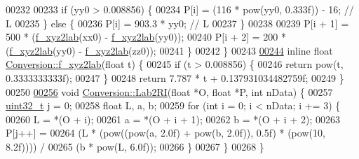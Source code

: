 \begin{DoxyCode}
00232 
00233     \textcolor{keywordflow}{if} (yy0 > 0.008856) \{
00234       P[i] = (116 * pow(yy0, 0.333f)) - 16; \textcolor{comment}{// L}
00235     \} \textcolor{keywordflow}{else} \{
00236       P[i] = 903.3 * yy0; \textcolor{comment}{// L}
00237     \}
00238 
00239     P[i + 1] = 500 * (\hyperlink{class_vision_1_1_conversion_aea73f90915cd0459dcaf70fb3e109a82}{f\_xyz2lab}(xx0) - \hyperlink{class_vision_1_1_conversion_aea73f90915cd0459dcaf70fb3e109a82}{f\_xyz2lab}(yy0));
00240     P[i + 2] = 200 * (\hyperlink{class_vision_1_1_conversion_aea73f90915cd0459dcaf70fb3e109a82}{f\_xyz2lab}(yy0) - \hyperlink{class_vision_1_1_conversion_aea73f90915cd0459dcaf70fb3e109a82}{f\_xyz2lab}(zz0));
00241   \}
00242 \}
00243 
\hypertarget{_conversion_8cpp_source_l00244}{}\hyperlink{class_vision_1_1_conversion_aea73f90915cd0459dcaf70fb3e109a82}{00244} \textcolor{keyword}{inline} \textcolor{keywordtype}{float} \hyperlink{class_vision_1_1_conversion_aea73f90915cd0459dcaf70fb3e109a82}{Conversion::f\_xyz2lab}(\textcolor{keywordtype}{float} t) \{
00245   \textcolor{keywordflow}{if} (t > 0.008856) \{
00246     \textcolor{keywordflow}{return} pow(t, 0.3333333333f);
00247   \}
00248   \textcolor{keywordflow}{return} 7.787 * t + 0.137931034482759f;
00249 \}
00250 
\hypertarget{_conversion_8cpp_source_l00256}{}\hyperlink{class_vision_1_1_conversion_adf3ad076d44a9986332f5078c5fa2cc7}{00256} \textcolor{keywordtype}{void} \hyperlink{class_vision_1_1_conversion_adf3ad076d44a9986332f5078c5fa2cc7}{Conversion::Lab2RI}(\textcolor{keywordtype}{float} *O, \textcolor{keywordtype}{float} *P, \textcolor{keywordtype}{int} nData) \{
00257   \hyperlink{_soil_math_types_8h_a435d1572bf3f880d55459d9805097f62}{uint32\_t} j = 0;
00258   \textcolor{keywordtype}{float} L, a, b;
00259   \textcolor{keywordflow}{for} (\textcolor{keywordtype}{int} i = 0; i < nData; i += 3) \{
00260     L = *(O + i);
00261     a = *(O + i + 1);
00262     b = *(O + i + 2);
00263     P[j++] =
00264         (L * (pow((pow(a, 2.0f) + pow(b, 2.0f)), 0.5f) * (pow(10, 8.2f)))) /
00265         (b * pow(L, 6.0f));
00266   \}
00267 \}
00268 \}
\end{DoxyCode}
